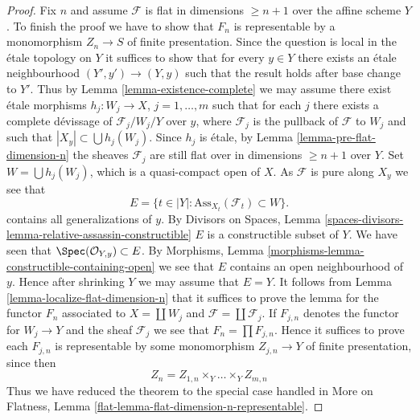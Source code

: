 \begin{proof}
\medskip\noindent
Fix $n$ and assume $\mathcal{F}$ is flat in dimensions $\geq n + 1$
over the affine scheme $Y$.
To finish the proof we have to show that $F_n$ is representable
by a monomorphism $Z_n \to S$ of finite presentation.
Since the question is local in the \'etale topology on $Y$ it suffices to
show that for every $y \in Y$ there exists an \'etale neighbourhood
$(Y', y') \to (Y, y)$ such that the result holds after base change to $Y'$.
Thus by
Lemma \ref{lemma-existence-complete}
we may assume there exist \'etale morphisms $h_j : W_j \to X$,
$j = 1, \ldots, m$ such that for each $j$ there exists a complete
d\'evissage of $\mathcal{F}_j/W_j/Y$ over $y$,
where $\mathcal{F}_j$ is the pullback of $\mathcal{F}$ to $W_j$
and such that $|X_y| \subset \bigcup h_j(W_j)$. Since
$h_j$ is \'etale, by
Lemma \ref{lemma-pre-flat-dimension-n}
the sheaves $\mathcal{F}_j$ are still flat over in
dimensions $\geq n + 1$ over $Y$.
Set $W = \bigcup h_j(W_j)$, which is a quasi-compact open of $X$.
As $\mathcal{F}$ is pure along $X_y$ we see that
$$
E = \{t \in |Y| : \text{Ass}_{X_t}(\mathcal{F}_t) \subset W \}.
$$
contains all generalizations of $y$. By
Divisors on Spaces,
Lemma \ref{spaces-divisors-lemma-relative-assassin-constructible}
$E$ is a constructible subset of $Y$. We have seen that
$\Spec(\mathcal{O}_{Y, y}) \subset E$. By
Morphisms, Lemma \ref{morphisms-lemma-constructible-containing-open}
we see that $E$ contains an open neighbourhood of $y$.
Hence after shrinking $Y$ we may assume that $E = Y$.
It follows from
Lemma \ref{lemma-localize-flat-dimension-n}
that it suffices to prove the lemma for the functor $F_n$ associated to
$X = \coprod W_j$ and $\mathcal{F} = \coprod \mathcal{F}_j$.
If $F_{j, n}$ denotes the functor for $W_j \to Y$ and the sheaf
$\mathcal{F}_j$ we see that $F_n = \prod F_{j, n}$. Hence it suffices
to prove each $F_{j, n}$ is representable by some monomorphism
$Z_{j, n} \to Y$ of finite presentation, since then
$$
Z_n = Z_{1, n} \times_Y \ldots \times_Y Z_{m, n}
$$
Thus we have reduced the theorem to the special case handled in
More on Flatness, Lemma \ref{flat-lemma-flat-dimension-n-representable}.
\end{proof}
